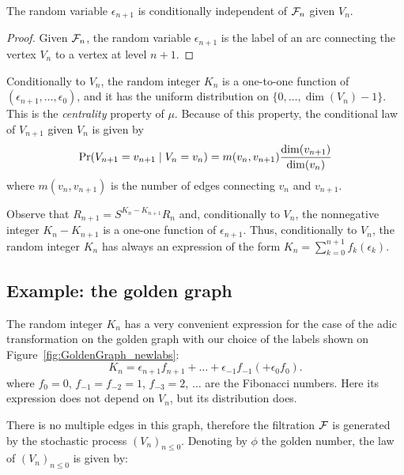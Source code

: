 \documentclass[12pt,a4paper]{article}
\begin{document}
\begin{lemma}
The random variable $\epsilon_{n+1}$ is conditionally independent of $\mathcal{F}_n$ 
given $V_n$. 
\end{lemma} 

\begin{proof}
Given $\mathcal{F}_n$, the random variable $\epsilon_{n+1}$ is the label of an 
arc connecting the vertex $V_n$ to a vertex at level $n+1$. 
\end{proof}

 Conditionally to $V_n$, the random integer $K_n$ is a one-to-one function of 
$(\epsilon_{n+1}, \ldots, \epsilon_0)$, and it has the 
uniform distribution on $\{0, \ldots, \dim(V_n)-1\}$. 
This is the \emph{centrality} property of $\mu$. 
Because of this property, the conditional law of $V_{n+1}$ given $V_n$ 
is given by 
$$
\Pr(V_{n+1}=v_{n+1} \mid V_n=v_n) = 
m(v_n, v_{n+1})\frac{\dim(v_{n+1})}{\dim(v_n)}
$$
where $m(v_n, v_{n+1})$ is the number of edges connecting $v_n$ and $v_{n+1}$. 


Observe that $R_{n+1} = S^{K_n - K_{n+1}}R_n$ and, 
conditionally to $V_n$, the nonnegative integer $K_n - K_{n+1}$ 
is a one-one function of $\epsilon_{n+1}$. 
Thus, conditionally to $V_n$, the random integer $K_n$ has always 
an expression of the form $K_n = \sum_{k=0}^{n+1}f_k(\epsilon_k)$. 


\subsection{Example: the golden graph}\label{sec:goldengraph}

The random integer $K_n$ has a very convenient expression for the case of the adic 
transformation on the golden graph with our choice of the labels shown on 
Figure~\ref{fig:GoldenGraph_newlabs}:
$$
K_n = \epsilon_{n+1}f_{n+1} + \ldots + \epsilon_{-1}f_{-1} (+ \epsilon_0f_{0}).   
$$
where $f_0=0$, $f_{-1}=f_{-2}=1$, $f_{-3}=2$,  $\ldots$ are the Fibonacci numbers.  
Here its expression does not depend on $V_n$, but its distribution does. 

There is no multiple edges in this graph, therefore the filtration $\mathcal{F}$ 
is generated by the stochastic process ${(V_n)}_{n \leq 0}$. 
Denoting by $\phi$ the golden number, the law of 
${(V_n)}_{n \leq 0}$ is given by:
\end{document}
